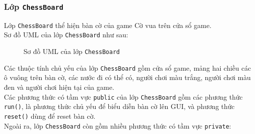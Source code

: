 \subsubsection{Lớp \lstinline{ChessBoard}}
Lớp \lstinline{ChessBoard} thể hiện bàn cờ của game Cờ vua trên cửa sổ game.\\
Sơ đồ UML của lớp \lstinline{ChessBoard} như sau:
\begin{figure}[H]
\caption{Sơ đồ UML của lớp \lstinline{ChessBoard}}
\end{figure}
Các thuộc tính chủ yếu của lớp \lstinline{ChessBoard} gồm cửa sổ game, mảng hai chiều các ô vuông trên bàn cờ, các nước đi có thể có, người chơi màu trắng, người chơi màu đen và người chơi hiện tại của game.\\
Các phương thức có tầm vực \lstinline{public} của lớp \lstinline{ChessBoard} gồm các phương thức \lstinline{run()}, là phương thức chủ yếu để biểu diễn bàn cờ lên GUI, và phương thức \lstinline{reset()} dùng để reset bàn cờ.\\
Ngoài ra, lớp \lstinline{ChessBoard} còn gồm nhiều phương thức có tầm vực \lstinline{private}:
